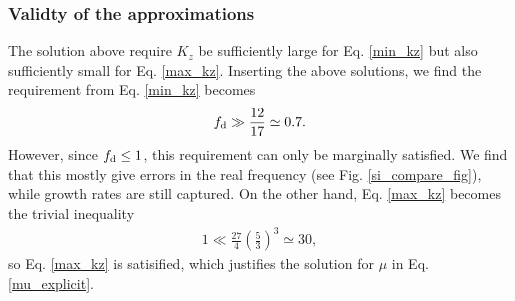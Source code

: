 \subsubsection{Validty of the approximations}
The solution above require $K_z$ be sufficiently large for
Eq. \ref{min_kz} but also sufficiently small for
Eq. \ref{max_kz}. Inserting the above solutions, we find the
requirement from Eq. \ref{min_kz} becomes 
\begin{align}
  f_\mathrm{d} \gg \frac{12}{17}\simeq 0.7.
\end{align}
However, since $f_\mathrm{d} \leq 1$, this requirement can only be marginally
satisfied. We find that this mostly give errors in the real
frequency (see Fig. \ref{si_compare_fig}), while growth rates are
still captured. On the other hand, Eq. \ref{max_kz} becomes the trivial 
inequality \begin{align}
  1\ll \frac{27}{4}\left(\frac{5}{3}\right)^3\simeq 30,
\end{align}
so Eq. \ref{max_kz} is satisified, which justifies the solution for
$\mu$ in Eq. \ref{mu_explicit}. 









































































